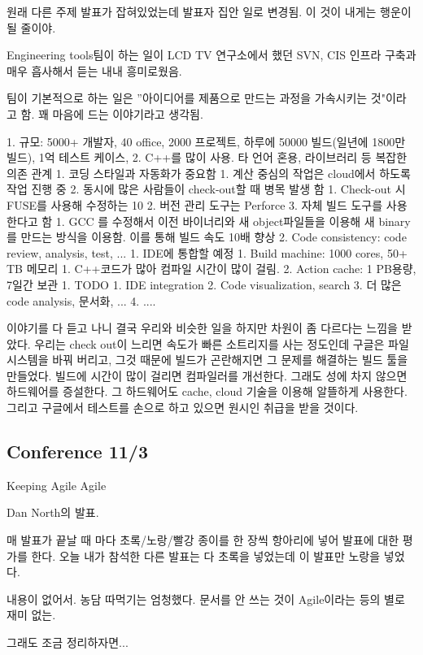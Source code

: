 \documentclass[a4paper]{article}
\begin{document}
원래 다른 주제 발표가 잡혀있었는데 발표자 집안 일로 변경됨. 이 것이
내게는 행운이 될 줄이야.
 
Engineering tools팀이 하는 일이 LCD TV 연구소에서 했던 SVN, CIS 인프라
구축과 매우 흡사해서 듣는 내내 흥미로웠음.
 
팀이 기본적으로 하는 일은 ”아이디어를 제품으로 만드는 과정을 가속시키는
것"이라고 함. 꽤 마음에 드는 이야기라고 생각됨.
 
1. 규모: 5000+ 개발자, 40 office, 2000 프로젝트, 하루에 50000 빌드(일년에 1800만 빌드), 1억  테스트 케이스,  
2. C++를 많이 사용. 타 언어 혼용, 라이브러리 등 복잡한 의존 관계
1. 코딩 스타일과 자동화가 중요함
1. 계산 중심의 작업은 cloud에서 하도록 작업 진행 중
2. 동시에 많은 사람들이 check-out할 때 병목 발생 함
1. Check-out 시 FUSE를 사용해 수정하는 10%
2. 버전 관리 도구는 Perforce
3. 자체 빌드 도구를 사용한다고 함
1. GCC 를 수정해서  이전 바이너리와 새 object파일들을 이용해 새 binary를 만드는 방식을 이용함. 이를 통해 빌드 속도 10배 향상
2. Code consistency: code review, analysis, test, ...
1. IDE에 통합할 예정
1. Build machine: 1000 cores, 50+ TB 메모리
1. C++코드가 많아 컴파일 시간이 많이 걸림.
2. Action cache: 1 PB용량, 7일간 보관
1. TODO
1. IDE integration 
2. Code  visualization, search
3. 더 많은 code analysis, 문서화, ...
4. .... 
 
이야기를 다 듣고 나니 결국 우리와 비슷한 일을 하지만 차원이 좀 다르다는
느낌을 받았다. 우리는 check out이 느리면 속도가 빠른 소트리지를 사는
정도인데 구글은 파일시스템을 바꿔 버리고, 그것 때문에 빌드가 곤란해지면
그 문제를 해결하는 빌드 툴을 만들었다. 빌드에 시간이 많이 걸리면
컴파일러를 개선한다. 그래도 성에 차지 않으면 하드웨어를 증설한다. 그
하드웨어도 cache, cloud 기술을 이용해 알뜰하게 사용한다. 그리고
구글에서 테스트를 손으로 하고 있으면 원시인 취급을 받을 것이다.

\subsection{Conference 11/3}Keeping Agile Agile
 
Dan North의 발표.  

매 발표가 끝날 때 마다 초록/노랑/빨강 종이를 한 장씩 항아리에 넣어
발표에 대한 평가를 한다.  오늘 내가 참석한 다른 발표는 다 초록을
넣었는데 이 발표만 노랑을 넣었다.
 
내용이 없어서. 농담 따먹기는 엄청했다. 문서를 안 쓰는 것이 Agile이라는 등의 별로 재미 없는.
 
그래도 조금 정리하자면...
 
\end{document}
